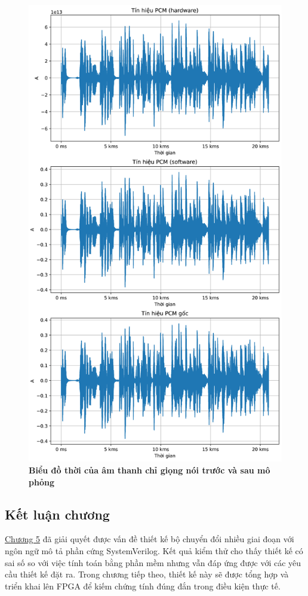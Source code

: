 \begin{figure}[H]
    \centering
    \includegraphics[width=12cm]{Images/Chuong4/tb/wav/vocal.png}
    \caption[Biểu đồ thời gian của âm thanh chỉ giọng nói trước và sau mô phỏng]{\bfseries \fontsize{12pt}{0pt}\selectfont Biểu đồ thời của âm thanh chỉ giọng nói trước và sau mô phỏng}
    \label{vocal}
\end{figure}



\subsection{Kết luận chương}

\hyperref[chuong4]{Chương 5} đã giải quyết được vấn đề thiết kế bộ chuyển đổi nhiều giai đoạn với ngôn ngữ mô tả phần cứng SystemVerilog. Kết quả kiểm thử cho thấy thiết kế có sai số so với việc tính toán bằng phần mềm nhưng vẫn đáp ứng được với các yêu cầu thiết kế đặt ra. Trong chương tiếp theo, thiết kế này sẽ được tổng hợp và triển khai lên FPGA để kiếm chứng tính đúng đắn trong điều kiện thực tế.

\newpage